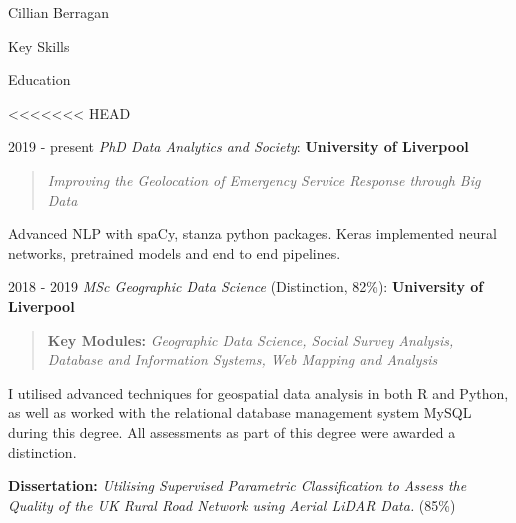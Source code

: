 \documentclass{scrartcl}
\begin{document}
\begin{cv}{Cillian Berragan}
\begin{cvlist}{Key Skills}
\end{cvlist}

\newpage
\begin{cvlist}{Education}

<<<<<<< HEAD
\item[2019 - present] \normalsize\textit{PhD Data Analytics and Society}: \textbf{University of Liverpool}

    \begin{quote}
        \small \textit{Improving the Geolocation of Emergency Service Response through Big Data}
    \end{quote}

    \small Advanced NLP with spaCy, stanza python packages. Keras implemented neural networks, pretrained models and end to end pipelines.

\item[2018 - 2019] \normalsize\textit{MSc Geographic Data Science} (Distinction, 82\%): \textbf{University of Liverpool}

    \begin{quote}
        \small\textbf{Key Modules: }\textit{Geographic Data Science, Social Survey Analysis, Database and Information Systems, Web Mapping and Analysis}
    \end{quote}

    \small I utilised advanced techniques for geospatial data analysis in both R and Python, as well as worked with the relational database management system MySQL during this degree. All assessments as part of this degree were awarded a distinction.

        \textbf{Dissertation:} \textit{Utilising Supervised Parametric Classification to Assess the Quality of the UK Rural Road Network using Aerial LiDAR Data.} (85\%)


\end{cvlist}
\end{cv}
\end{document}
